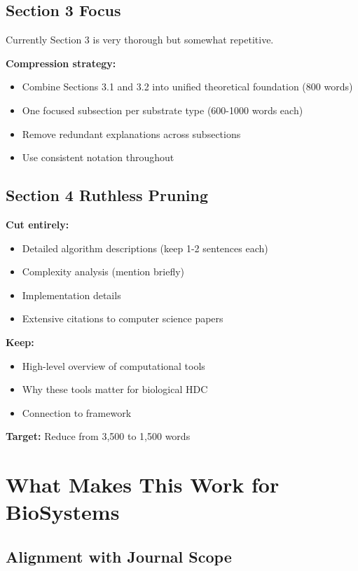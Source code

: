 \documentclass[11pt]{article}
\begin{document}
\subsection{Section 3 Focus}

Currently Section 3 is very thorough but somewhat repetitive. 

\textcolor{compress}{\textbf{Compression strategy:}}
\begin{itemize}
    \item Combine Sections 3.1 and 3.2 into unified theoretical foundation (800 words)
    \item One focused subsection per substrate type (600-1000 words each)
    \item Remove redundant explanations across subsections
    \item Use consistent notation throughout
\end{itemize}

\subsection{Section 4 Ruthless Pruning}

\textcolor{cut}{\textbf{Cut entirely:}}
\begin{itemize}
    \item Detailed algorithm descriptions (keep 1-2 sentences each)
    \item Complexity analysis (mention briefly)
    \item Implementation details
    \item Extensive citations to computer science papers
\end{itemize}

\textcolor{keep}{\textbf{Keep:}}
\begin{itemize}
    \item High-level overview of computational tools
    \item Why these tools matter for biological HDC
    \item Connection to framework
\end{itemize}

\textbf{Target:} Reduce from 3,500 to 1,500 words

\section{What Makes This Work for BioSystems}

\subsection{Alignment with Journal Scope}
\end{document}

